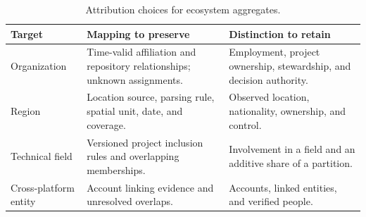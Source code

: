 \begin{table}[tbp]
\caption{Attribution choices for ecosystem aggregates.}
\label{tab:ch9-mapping}
\centering\small\renewcommand{\arraystretch}{1.14}
\begin{tabularx}{\linewidth}{@{}>{\raggedright\arraybackslash}p{23mm}>{\raggedright\arraybackslash}X>{\raggedright\arraybackslash}X@{}}\toprule
Target & Mapping to preserve & Distinction to retain \\\midrule
Organization & Time-valid affiliation and repository relationships; unknown assignments. & Employment, project ownership, stewardship, and decision authority.\\
Region & Location source, parsing rule, spatial unit, date, and coverage. & Observed location, nationality, ownership, and control.\\
Technical field & Versioned project inclusion rules and overlapping memberships. & Involvement in a field and an additive share of a partition.\\
Cross-platform entity & Account linking evidence and unresolved overlaps. & Accounts, linked entities, and verified people.\\\bottomrule
\end{tabularx}
\end{table}
